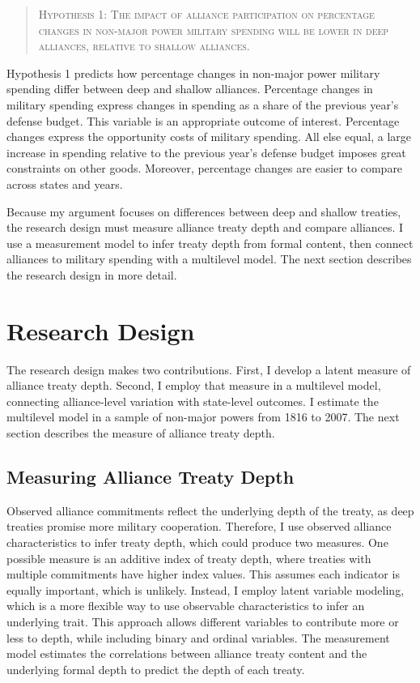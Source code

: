 \documentclass[12pt]{article}
\begin{document}
\begin{quote}
\textsc{Hypothesis 1: The impact of alliance participation on percentage changes in non-major power military spending will be lower in deep alliances, relative to shallow alliances.}
\end{quote}


Hypothesis 1 predicts how percentage changes in non-major power military spending differ between deep and shallow alliances. 
Percentage changes in military spending express changes in spending as a share of the previous year's defense budget.
This variable is an appropriate outcome of interest. 
Percentage changes express the opportunity costs of military spending. 
All else equal, a large increase in spending relative to the previous year's defense budget imposes great constraints on other goods. 
Moreover, percentage changes are easier to compare across states and years. 


Because my argument focuses on differences between deep and shallow treaties, the research design must measure alliance treaty depth and compare alliances.  
I use a measurement model to infer treaty depth from formal content, then connect alliances to military spending with a multilevel model. 
The next section describes the research design in more detail. 



\section{Research Design} 


The research design makes two contributions. 
First, I develop a latent measure of alliance treaty depth. 
Second, I employ that measure in a multilevel model, connecting alliance-level variation with state-level outcomes. 
I estimate the multilevel model in a sample of non-major powers from 1816 to 2007. 
The next section describes the measure of alliance treaty depth. 


\subsection{Measuring Alliance Treaty Depth} 


Observed alliance commitments reflect the underlying depth of the treaty, as deep treaties promise more military cooperation. 
Therefore, I use observed alliance characteristics to infer treaty depth, which could produce two measures. 
One possible measure is an additive index of treaty depth, where treaties with multiple commitments have higher index values. 
This assumes each indicator is equally important, which is unlikely. 
Instead, I employ latent variable modeling, which is a more flexible way to use observable characteristics to infer an underlying trait. 
This approach allows different variables to contribute more or less to depth, while including binary and ordinal variables.  
The measurement model estimates the correlations between alliance treaty content and the underlying formal depth to predict the depth of each treaty. 
\end{document}
